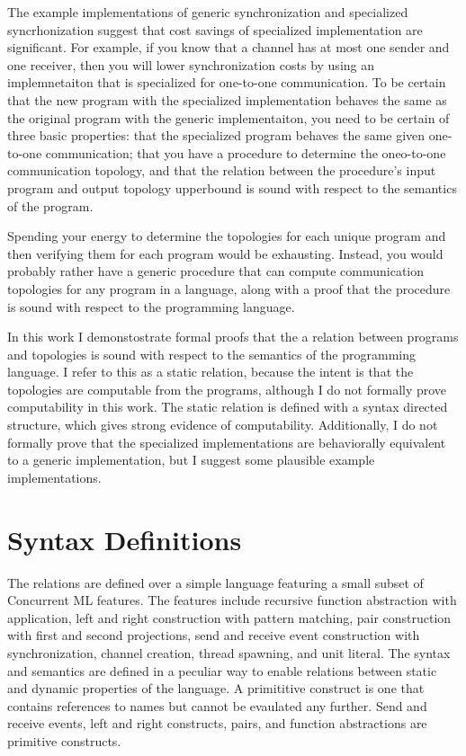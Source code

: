 The example implementations of generic synchronization and specialized syncrhonization suggest
that cost savings of specialized implementation are significant.  For example, if you know that
a channel has at most one sender and one receiver, then you will lower synchronization costs by
using an implemnetaiton that is specialized for one-to-one communication.  To be certain that
the new program with the specialized implementation behaves the same as the original program
with the generic implementaiton, you need to be certain of three basic properties: that the
specialized program behaves the same given one-to-one communication; that you have a procedure
to determine the oneo-to-one communication topology, and that the relation between the
procedure's input program and output topology upperbound is sound with respect to the semantics
of the program.  

Spending your energy to determine the topologies for each unique program and then verifying
them for each program would be exhausting. Instead, you would probably rather have a generic
procedure that can compute communication topologies for any program in a language, along with
a proof that the procedure is sound with respect to the programming language.

In this work I demonstostrate formal proofs that the a relation between programs and topologies
is sound with respect to the semantics of the programming language.  I refer to this as a
static relation, because the intent is that the topologies are computable from the programs,
although I do not formally prove computability in this work.  The static relation is defined
with a syntax directed structure, which gives strong evidence of computability.  Additionally,
I do not formally prove that the specialized implementations are behaviorally equivalent to a
generic implementation, but I suggest some plausible example implementations.

\section{Syntax Definitions}
The relations are defined over a simple language featuring a small subset of Concurrent ML
features. The features include recursive function abstraction with application, left and right
construction with pattern matching, pair construction with first and second projections, send
and receive event construction with synchronization, channel creation, thread spawning, and
unit literal.  The syntax and semantics are defined in a peculiar way to enable relations
between static and dynamic properties of the language.  A primititive construct is one that
contains references to names but cannot be evaulated any further. Send and receive events,
left and right constructs, pairs, and function abstractions are primitive constructs.

